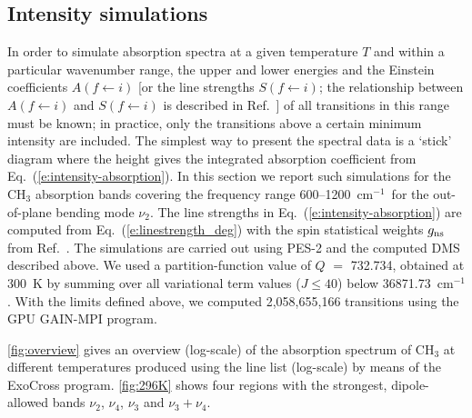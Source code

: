 \documentclass{achemso}
\renewcommand{\eqref}[1]{(\ref{#1})}
\newcommand{\3}{$_{3}$}
\newcommand{\cm}{cm$^{-1}$}
\begin{document}
\subsection{Intensity simulations} \label{subsec:intens}
In order to simulate absorption spectra at a given temperature $T$ and within a
particular wavenumber range, the upper and lower energies and the
Einstein coefficients $A(f \leftarrow i)$ [or the line strengths
$S(f \leftarrow i)$; the relationship between
 $A(f \leftarrow i)$ and
$S(f \leftarrow i)$ is described in Ref.~] of
all transitions in this range must be known; in practice, only the
transitions above a certain minimum intensity are included. The
simplest way to present the spectral data is a `stick' diagram
where the height gives the integrated absorption coefficient from
Eq.~\eqref{e:intensity-absorption}. In this section we report such
simulations for the CH$_3$ absorption bands covering the frequency
range 600--1200~\cm\ for the out-of-plane bending mode $\nu_2$. The line strengths in
Eq.~\eqref{e:intensity-absorption} are computed from
Eq.~\eqref{e:linestrength_deg} with the spin statistical weights
$g_{\rm ns}$ from Ref.~.
The simulations are carried out using PES-2 and the computed DMS
described above.
We used a partition-function value of $Q$ $=$ 732.734,
obtained at 300~K by summing over all variational term values ($J\le 40$) below
36871.73~\cm. With the limits defined above, we computed
2,058,655,166 transitions using the GPU GAIN-MPI program.\citep{17AlYuTe}

\ref{fig:overview} gives an overview (log-scale) of the absorption spectrum of CH$_3$ at different temperatures produced using the line list (log-scale) by means of the ExoCross program\cite{exocross}. \ref{fig:296K} shows  four regions with the strongest, dipole-allowed bands $\nu_2$, $\nu_4$, $\nu_3$ and $\nu_3+\nu_4$.
\end{document}

